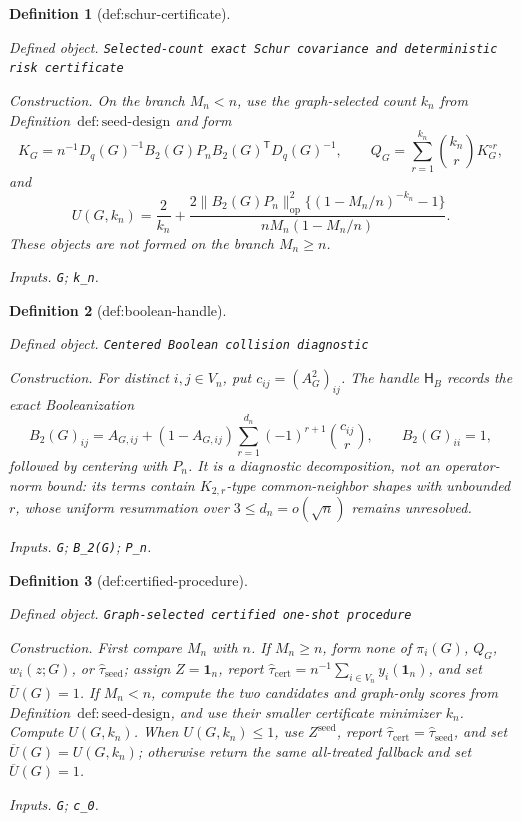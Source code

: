 \documentclass{article}
\newtheorem{definition}{Definition}
\begin{document}
\begin{definition}[def:schur-certificate]\label{def:schur-certificate}
\par\smallskip\noindent\emph{Defined object.} \texttt{Selected-\allowbreak{}count exact Schur covariance and deterministic risk certificate}
\par\smallskip\noindent\emph{Construction.} On the branch \(M_n<n\), use the graph-selected count \(k_n\) from Definition~\(\mathrm{def{:}seed\mbox{-}design}\) and form
\[
K_G=n^{-1}D_q(G)^{-1}B_2(G)P_nB_2(G)^{\mathsf T}D_q(G)^{-1},
\qquad
Q_G=\sum_{r=1}^{k_n}\binom{k_n}{r}K_G^{\circ r},
\]
and
\[
U(G,k_n)=\frac{2}{k_n}+
\frac{2\|B_2(G)P_n\|_{\mathrm{op}}^2\{(1-M_n/n)^{-k_n}-1\}}
{nM_n(1-M_n/n)}.
\]
These objects are not formed on the branch \(M_n\ge n\).
\par\smallskip\noindent\emph{Inputs.} \texttt{G}; \texttt{k\_\allowbreak{}n}.
\end{definition}

\begin{definition}[def:boolean-handle]\label{def:boolean-handle}
\par\smallskip\noindent\emph{Defined object.} \texttt{Centered Boolean collision diagnostic}
\par\smallskip\noindent\emph{Construction.} For distinct \(i,j\in V_n\), put \(c_{ij}=(A_G^2)_{ij}\).  The handle \(\mathsf H_B\) records the exact Booleanization
\[
B_2(G)_{ij}=A_{G,ij}+(1-A_{G,ij})
\sum_{r=1}^{d_n}(-1)^{r+1}\binom{c_{ij}}{r},
\qquad B_2(G)_{ii}=1,
\]
followed by centering with \(P_n\).  It is a diagnostic decomposition, not an operator-norm bound: its terms contain \(K_{2,r}\)-type common-neighbor shapes with unbounded \(r\), whose uniform resummation over \(3\le d_n=o(\sqrt n)\) remains unresolved.
\par\smallskip\noindent\emph{Inputs.} \texttt{G}; \texttt{B\_\allowbreak{}2(G)}; \texttt{P\_\allowbreak{}n}.
\end{definition}

\begin{definition}[def:certified-procedure]\label{def:certified-procedure}
\par\smallskip\noindent\emph{Defined object.} \texttt{Graph-\allowbreak{}selected certified one-\allowbreak{}shot procedure}
\par\smallskip\noindent\emph{Construction.} First compare \(M_n\) with \(n\).  If \(M_n\ge n\), form none of \(\pi_i(G)\), \(Q_G\), \(w_i(z;G)\), or \(\widehat\tau_{\mathrm{seed}}\); assign \(Z=\mathbf 1_n\), report \(\widehat\tau_{\mathrm{cert}}=n^{-1}\sum_{i\in V_n}y_i(\mathbf 1_n)\), and set \(\overline U(G)=1\).  If \(M_n<n\), compute the two candidates and graph-only scores from Definition~\(\mathrm{def{:}seed\mbox{-}design}\), and use their smaller certificate minimizer \(k_n\).  Compute \(U(G,k_n)\).  When \(U(G,k_n)\le1\), use \(Z^{\mathrm{seed}}\), report \(\widehat\tau_{\mathrm{cert}}=\widehat\tau_{\mathrm{seed}}\), and set \(\overline U(G)=U(G,k_n)\); otherwise return the same all-treated fallback and set \(\overline U(G)=1\).
\par\smallskip\noindent\emph{Inputs.} \texttt{G}; \texttt{c\_\allowbreak{}0}.
\end{definition}
\end{document}
